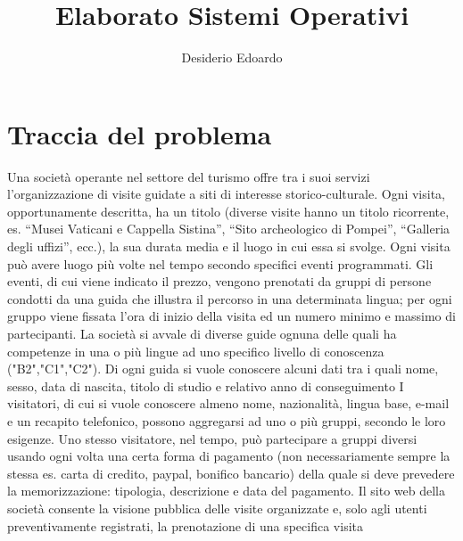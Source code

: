 \documentclass[a4paper,12pt]{report}
\title{Elaborato Sistemi Operativi}
\author{Desiderio Edoardo}
\begin{document}
\maketitle
\titlepage
\tableofcontents
\newpage

\chapter{Traccia del problema}
Una	 società	 operante	 nel	 settore	 del	 turismo	 offre	 tra	 i	 suoi	 servizi	 l’organizzazione	 di	 	 visite	
guidate	a	siti	di	interesse	storico-culturale.
Ogni	visita,	opportunamente	descritta,	ha	un	 titolo	 (diverse	visite	hanno	un	 titolo	 ricorrente,	es.	
“Musei	Vaticani	e	Cappella	Sistina”,	“Sito	archeologico	di	Pompei”,	“Galleria	degli	uffizi”,	ecc.),	la	
sua	durata	media		e	il	luogo		in	cui	essa	si	svolge.	Ogni	visita	può	avere	luogo	più	volte	nel	tempo	
secondo	specifici	eventi	programmati.
Gli	eventi,	di	cui	viene	indicato	il	prezzo,	vengono	prenotati	da	gruppi	di	persone	condotti	da	una	
guida	che	illustra	il	percorso	in	una	determinata	lingua;	per	ogni	gruppo	viene	fissata	l’ora	di	inizio	
della	visita	ed	un	numero	minimo	e	massimo	di	partecipanti.
La	società	si	avvale	di	diverse	guide	ognuna	delle	quali	ha	competenze	in	una	o	più	lingue	ad	uno	
specifico	 livello	 di	 conoscenza	 ("B2","C1","C2").	 	 Di	 ogni	 guida	 si	 vuole	
conoscere	 alcuni	 dati	 tra	 i	 quali	 nome,	 sesso,	 data	 di	 nascita,	 titolo	 di	 studio	 e	 relativo	 anno	 di	
conseguimento
I	visitatori,	di	cui	si	vuole	conoscere	almeno	nome,	nazionalità,	lingua	base,	e-mail	e	un	 recapito	
telefonico,	 possono	 aggregarsi	 ad	 uno	 o	 più	 gruppi,	 secondo	 le	 loro	 esigenze.	 Uno	 stesso	
visitatore,	 nel	 tempo,	 può	 partecipare	 a	 gruppi	 diversi	 usando	 ogni	 volta	 una	 certa	 forma	 di	
pagamento	(non	necessariamente	sempre	la	stessa	es.	carta	di	credito,	paypal,	bonifico	bancario)	
della	quale	si	deve	prevedere	la	memorizzazione:	tipologia,	descrizione	e	data	del	pagamento.
Il	 sito	 web	 della	 società	 consente	 la	 visione	 pubblica	 delle	 visite	 organizzate	 e,	 solo	 agli	 utenti	
preventivamente	registrati,	la	prenotazione	di	una	specifica	visita
\end{document}
